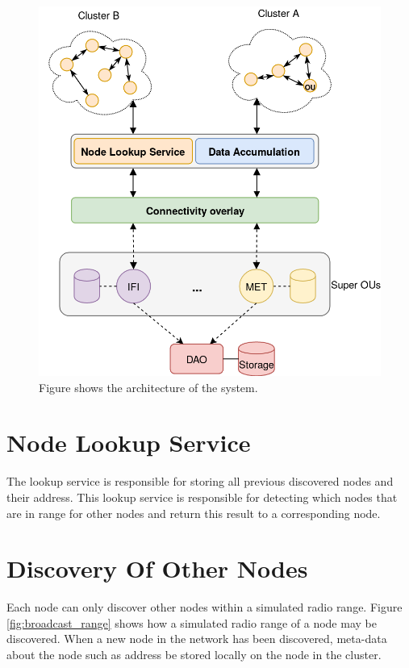 \documentclass[USenglish]{uit-thesis}
\begin{document}
\begin{figure}
\centering
\includegraphics[width=\textwidth]{arch3.png}
\caption{Figure shows the architecture of the system.}
\label{fig:architecture3}
\end{figure}

\section{Node Lookup Service} \label{sec:nodeLS}
The lookup service is responsible for storing all previous discovered nodes and their address. This lookup service is responsible for detecting which nodes that are in range for other nodes and return this result to a corresponding node. 



\section{Discovery Of Other Nodes} \label{sec:discON}
Each node can only discover other nodes within a simulated radio range. Figure \ref{fig:broadcast_range} shows how a simulated radio range of a node may be discovered. When a new node in the network has been discovered, meta-data about the node such as address be stored locally on the node in the cluster.
\end{document}
